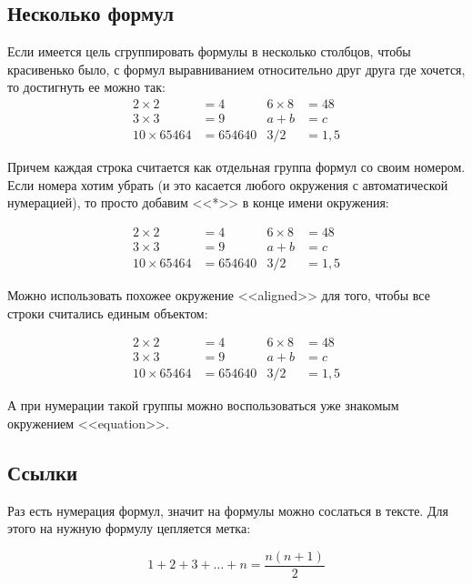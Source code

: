 \documentclass[a4paper,12pt]{article} %
\begin{document}
\subsection{Несколько формул}

Если имеется цель сгруппировать формулы в несколько столбцов, чтобы красивенько было, с формул выравниванием относительно друг друга где хочется, то достигнуть ее можно так:
\begin{align} %
	2\times 2 &= 4 & 6\times 8 &= 48 \\
	3\times 3 &= 9 & a+b &= c\\
	10 \times 65464 &= 654640 & 3/2&=1,5
\end{align}

Причем каждая строка считается как отдельная группа формул со своим номером. Если номера хотим убрать (и это касается любого окружения с автоматической нумерацией), то просто добавим <<*>> в конце имени окружения:

\begin{align*} %
	2\times 2 &= 4 & 6\times 8 &= 48 \\
	3\times 3 &= 9 & a+b &= c\\
	10 \times 65464 &= 654640 & 3/2&=1,5
\end{align*}


Можно использовать похожее окружение <<aligned>> для того, чтобы все строки считались единым объектом:

$$ %
\begin{aligned}
	2\times 2 &= 4 & 6\times 8 &= 48 \\
	3\times 3 &= 9 & a+b &= c\\
	10 \times 65464 &= 654640 & 3/2&=1,5
\end{aligned}
$$

А при нумерации такой группы можно воспользоваться уже знакомым окружением <<equation>>.

\subsection{Ссылки}

Раз есть нумерация формул, значит на формулы можно сослаться в тексте. Для этого на нужную формулу цепляется метка:

\begin{equation}\label{sum}
	1 + 2 + 3 + \dots + n = \dfrac{n(n+1)}{2} \tag{$\star$}
\end{equation}
\end{document}
